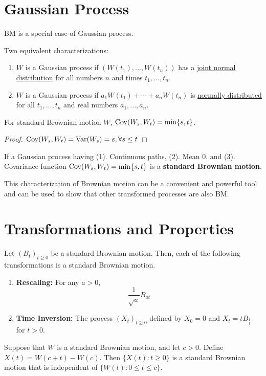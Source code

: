 \documentclass[11pt]{elegantbook}
\begin{document}
\section{ Gaussian Process}
BM is a special case of Gaussian process.
\begin{definition}
    Two equivalent characterizations:
    \begin{enumerate}
        \item $W$ is a Gaussian process if $(W(t_1),...,W(t_n))$ has a \underline{joint normal distribution} for all numbers $n$ and times $t_1,...,t_n$.
        \item $W$ is a Gaussian process if $a_1 W(t_1)+\cdots +a_n W(t_n)$ is \underline{normally distributed} for all $t_1,...,t_n$ and real numbers $a_1,...,a_n$.
    \end{enumerate}
\end{definition}

\begin{claim}
    For standard Brownian motion $W$, $\textnormal{Cov}(W_s, W_t) = \min\{s, t\}$.
\end{claim}
\begin{proof}
    $\textnormal{Cov}(W_s,W_t)=\textnormal{Var}(W_s)=s,\forall s\leq t$
\end{proof}



\begin{proposition}
    If a Gaussian process having (1). Continuous paths, (2). Mean $0$, and (3). Covariance function $\textnormal{Cov}(W_s,W_t) = \min\{s, t\}$ is a \textbf{standard Brownian motion}.
\end{proposition}
This characterization of Brownian motion can be a convenient and powerful tool and can be used to show that other transformed processes are also BM.


\section{Transformations and Properties}
\begin{lemma}
    Let $(B_t)_{t\geq 0}$ be a standard Brownian motion. Then, each of the following transformations is a standard Brownian motion.
    \begin{enumerate}
        \item \textbf{Rescaling:} For any $a > 0$, $$\frac{1}{\sqrt{a}}B_{at}$$
        \item \textbf{Time Inversion:} The process $(X_t)_{t\geq 0}$ defined by $X_0=0$ and $X_t=t B_{\frac{1}{t}}$ for $t>0$.
    \end{enumerate}
\end{lemma}

\begin{proposition}
    Suppose that $W$ is a standard Brownian motion, and let $c > 0$. Define $X(t) = W(c + t) - W(c)$. Then $\{X(t) : t \geq 0\}$ is a standard Brownian motion that is independent of $\{W(t) : 0 \leq t \leq c\}$.
\end{proposition}
\end{document}
